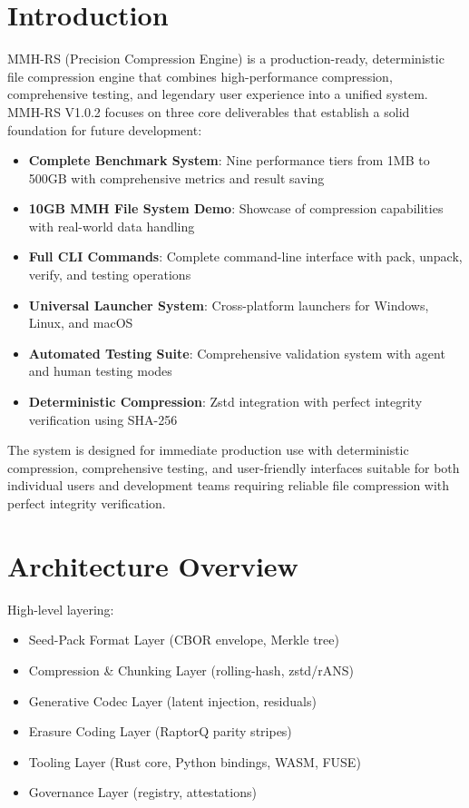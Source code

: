 \documentclass[11pt,a4paper]{article}
\begin{document}
	\section{Introduction}
	\label{sec:intro}
	
	MMH-RS (Precision Compression Engine) is a production-ready, deterministic file compression engine that combines high-performance compression, comprehensive testing, and legendary user experience into a unified system. MMH-RS V1.0.2 focuses on three core deliverables that establish a solid foundation for future development:
	
	\begin{itemize}
		\item \textbf{Complete Benchmark System}: Nine performance tiers from 1MB to 500GB with comprehensive metrics and result saving
		\item \textbf{10GB MMH File System Demo}: Showcase of compression capabilities with real-world data handling
		\item \textbf{Full CLI Commands}: Complete command-line interface with pack, unpack, verify, and testing operations
		\item \textbf{Universal Launcher System}: Cross-platform launchers for Windows, Linux, and macOS
		\item \textbf{Automated Testing Suite}: Comprehensive validation system with agent and human testing modes
		\item \textbf{Deterministic Compression}: Zstd integration with perfect integrity verification using SHA-256
	\end{itemize}
	
	The system is designed for immediate production use with deterministic compression, comprehensive testing, and user-friendly interfaces suitable for both individual users and development teams requiring reliable file compression with perfect integrity verification.
	
	
	\section{Architecture Overview}
	\label{sec:architecture}
	High-level layering:
	\begin{itemize}
		\item Seed-Pack Format Layer (CBOR envelope, Merkle tree)
		\item Compression \& Chunking Layer (rolling-hash, zstd/rANS)
		\item Generative Codec Layer (latent injection, residuals)
		\item Erasure Coding Layer (RaptorQ parity stripes)
		\item Tooling Layer (Rust core, Python bindings, WASM, FUSE)
		\item Governance Layer (registry, attestations)
	\end{itemize}
	
\end{document}
